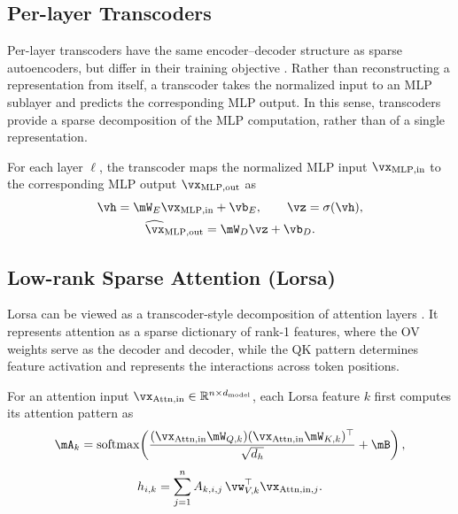 \documentclass{article}
\begin{document}
\subsection{Per-layer Transcoders}
\label{sec:per_layer_transcoder}

Per-layer transcoders have the same encoder--decoder structure as sparse autoencoders, 
but differ in their training objective \citep{dunefsky2024transcoder}. Rather than reconstructing a representation from itself, 
a transcoder takes the normalized input to an MLP sublayer and predicts the corresponding MLP output. 
In this sense, transcoders provide a sparse decomposition of the MLP computation, 
rather than of a single representation.

For each layer $\ell$, the transcoder maps the normalized MLP input
$\vx_{\mathrm{MLP,in}}$ to the corresponding MLP output
$\vx_{\mathrm{MLP,out}}$ as
\begin{equation}
    \begin{gathered}
        \vh = \mW_E \vx_{\mathrm{MLP,in}} + \vb_E,
        \qquad
        \vz = \sigma(\vh), \\
        \widehat{\vx}_{\mathrm{MLP,out}}
        = \mW_D \vz + \vb_D.
    \end{gathered}
\end{equation}


\subsection{Low-rank Sparse Attention (Lorsa)}
\label{sec:lorsa}

Lorsa can be viewed as a transcoder-style decomposition of attention layers \citep{he2025lorsa}. 
It represents attention as a sparse dictionary of rank-1 features, where the OV 
weights serve as the decoder and decoder, while the QK pattern determines feature activation and 
represents the interactions across token positions.

For an attention input
$\vx_{\mathrm{Attn,in}} \in \mathbb{R}^{n \times d_{\mathrm{model}}}$,
each Lorsa feature $k$ first computes its attention pattern as
\begin{equation}
\begin{gathered}
    \mA_k =
    \operatorname{softmax}\!\left(
    \frac{
        (\vx_{\mathrm{Attn,in}}\mW_{Q,k})
        (\vx_{\mathrm{Attn,in}}\mW_{K,k})^\top
    }{\sqrt{d_h}}
    + \mB
    \right), \\[4pt]
    h_{i,k}
    =
    \sum_{j=1}^{n}
    A_{k,i,j}\,
    \vw_{V,k}^{\top}
    \vx_{\mathrm{Attn,in},j}.
\end{gathered}
\end{equation}
\end{document}
